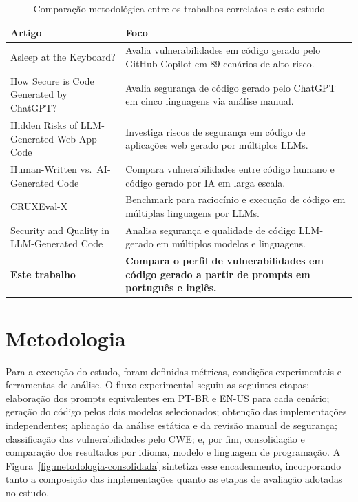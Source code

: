 \documentclass[12pt]{article}
\begin{document}
\begin{table}[ht]
\centering
\caption{Comparação metodológica entre os trabalhos correlatos e este estudo}
\label{tab:correlatos}
\small
\begin{tabularx}{\textwidth}{p{4.2cm}X}
\hline
\textbf{Artigo} & \textbf{Foco} \\
\hline
Asleep at the Keyboard? & Avalia vulnerabilidades em código gerado pelo GitHub Copilot em 89 cenários de alto risco. \\ \hline
How Secure is Code Generated by ChatGPT? & Avalia segurança de código gerado pelo ChatGPT em cinco linguagens via análise manual. \\ \hline
Hidden Risks of LLM-Generated Web App Code & Investiga riscos de segurança em código de aplicações web gerado por múltiplos LLMs. \\ \hline
Human-Written vs.\ AI-Generated Code & Compara vulnerabilidades entre código humano e código gerado por IA em larga escala. \\ \hline
CRUXEval-X & Benchmark para raciocínio e execução de código em múltiplas linguagens por LLMs. \\ \hline
Security and Quality in LLM-Generated Code & Analisa segurança e qualidade de código LLM-gerado em múltiplos modelos e linguagens. \\ \hline
\textbf{Este trabalho} & \textbf{Compara o perfil de vulnerabilidades em código gerado a partir de prompts em português e inglês.} \\ \hline
\end{tabularx}
\end{table}


\section{Metodologia}
\label{sec:metodologia}

Para a execução do estudo, foram definidas métricas, condições experimentais e ferramentas de análise. O fluxo experimental seguiu as seguintes etapas: elaboração dos prompts equivalentes em PT-BR e EN-US para cada cenário; geração do código pelos dois modelos selecionados; obtenção das implementações independentes; aplicação da análise estática e da revisão manual de segurança; classificação das vulnerabilidades pelo CWE; e, por fim, consolidação e comparação dos resultados por idioma, modelo e linguagem de programação. A Figura~\ref{fig:metodologia-consolidada} sintetiza esse encadeamento, incorporando tanto a composição das implementações quanto as etapas de avaliação adotadas no estudo.
\end{document}
